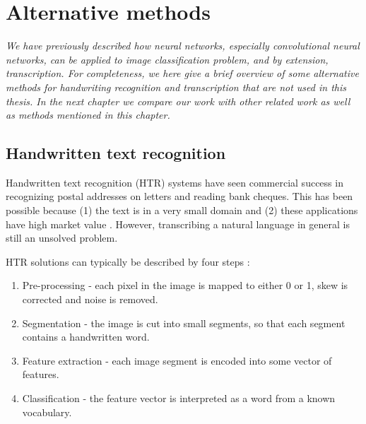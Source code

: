 
\chapter{Alternative methods}
\textit{ We have previously described how neural networks, especially convolutional neural networks, can be applied to image classification problem, and by extension, transcription.
For completeness, we here give a brief overview of some alternative methods for handwriting recognition and transcription that are not used in this thesis.
In the next chapter we compare our work with other related work as well as methods mentioned in this chapter.
}



\section{Handwritten text recognition} \label{sec:alt_htr}

Handwritten text recognition (HTR) systems have
seen commercial success in
recognizing postal addresses on letters \cite{lecun_1989, zipcode_system} and reading bank cheques. This has been possible because (1) the text is in a very small domain and (2) these applications have high market value \cite{40_years_HWR}. However, transcribing a natural language in general is still an unsolved problem.

HTR solutions can typically be described by four steps \cite{offline_HWR_CNN}:
\begin{enumerate}
    \item Pre-processing - each pixel in the image is mapped to either 0 or 1, skew is corrected and noise is removed.
    \item Segmentation - the image is cut into small segments, so that each segment contains a handwritten word.
    \item Feature extraction - each image segment is encoded into some vector of features.
    \item Classification - the feature vector is interpreted as a word from a known vocabulary.
\end{enumerate}

